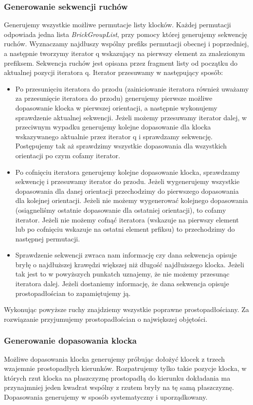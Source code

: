 \documentclass[12pt]{article}
\begin{document}
\subsubsection{Generowanie sekwencji ruchów}
Generujemy wszystkie możliwe permutacje listy klocków. Każdej permutacji odpowiada jedna lista \textit{BrickGroupList},
przy pomocy której generujemy sekwencję ruchów. Wyznaczamy najdłuszy wspólny prefiks permutacji obecnej i poprzedniej, 
a następnie tworzymy iterator q wskazujący na pierwszy element za znalezionym prefiksem.
Sekwencja ruchów jest opisana przez fragment listy od początku do aktualnej pozycji iteratora q.
Iterator przesuwamy w następujący sposób:
\begin{itemize}
 \item Po przesunięciu iteratora do przodu (zainiciowanie iteratora również uważamy za przesunięcie iteratora do przodu)
generujemy pierwsze możliwe dopasowanie klocka w pierwszej orientacji, a następnie
wykonujemy sprawdzenie aktualnej sekwencji. Jeżeli możemy przesuwamy iterator dalej, w przeciwnym wypadku generujemy kolejne
dopasowanie dla klocka wskazywanego aktualnie przez iterator q i sprawdzamy sekwencję. Postępujemy tak aż sprawdzimy
wszystkie dopasowania dla wszystkich orientacji po czym cofamy iterator.
 \item Po cofnięciu iteratora generujemy kolejne dopasowanie klocka, sprawdzamy sekwencję i przesuwamy iterator do przodu.
 Jeżeli wygenerujemy wszystkie dopasowania dla danej orientacji przechodzimy do pierwszego dopasowania dla kolejnej orientacji.
 Jeżeli nie możemy wygenerować kolejnego dopasowania (osiągneliśmy ostatnie dopasowanie dla ostatniej orientacji), to 
 cofamy iterator. Jeżeli nie możemy cofnąć iteratora (wskazuje na pierwszy element lub po cofnięciu wskazuje na ostatni element prfiksu)
 to przechodzimy do następnej permutacji.
 \item Sprawdzenie sekwencji zwraca nam informację czy dana sekwencja opisuje bryłę o najdłuższej krawędzi większej niż
długość najdłuższego klocka. Jeżeli tak jest to w powyższych punkatch uznajemy, że nie możemy przesunąc iteratora dalej.
Jeżeli dostaniemy informację, że dana sekwencja opisuje prostopadłościan to zapamiętujemy ją.
 \end{itemize}
Wykonując powyższe ruchy znajdziemy wszystkie poprawne prostopadłościany. Za rozwiązanie przyjumujemy prostopadłościan o
największej objętości.
\subsubsection{Generowanie dopasowania klocka}
Możliwe dopasowania klocka generujemy próbując dołożyć klocek z trzech wzajemnie prostopadłych kierunków. Rozpatrujemy
tylko takie pozycje klocka, w których rzut  klocka na płaszczyznę prostopadłą do kierunku dokładania ma przynajmniej 
jeden kwadrat wspólny z rzutem bryły na tę samą płaszczyznę. Dopasowania generujemy w sposób systematyczny i uporządkowany.
\end{document}
